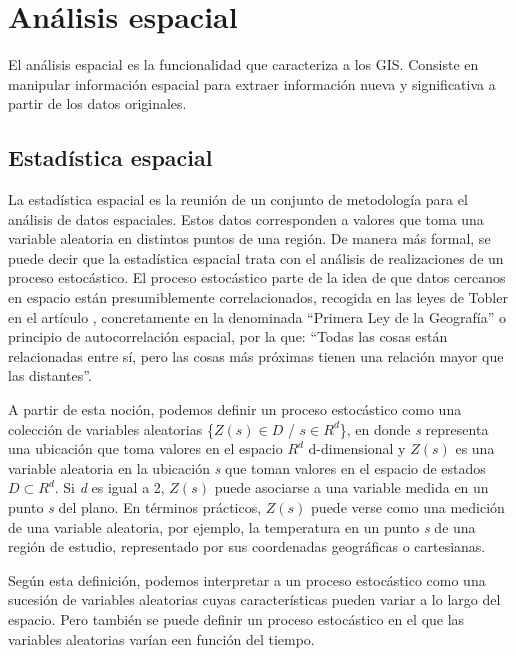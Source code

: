 \chapter*{Análisis espacial} \label{cap:analisis}
\setcounter{chapter}{4} 
\setcounter{section}{0}
El análisis espacial es la funcionalidad que caracteriza a los GIS. Consiste en manipular información espacial para extraer información nueva y significativa a partir de los datos originales. 

\section{Estadística espacial}
La estadística espacial es la reunión de un conjunto de metodología para el análisis de datos espaciales.
Estos datos corresponden a valores que toma una variable aleatoria en distintos puntos de una región. 
De manera más formal, se puede decir que la estadística espacial trata con el análisis de realizaciones de un proceso estocástico.
El proceso estocástico parte de la idea de que datos cercanos en espacio están presumiblemente correlacionados, 
recogida en las leyes de Tobler en el artículo \cite{Tobler1970}, concretamente en la denominada “Primera Ley de la Geografía” o principio de autocorrelación espacial, por la que:
“Todas las cosas están relacionadas entre sí, pero las cosas más próximas tienen una relación mayor que las distantes”.

A partir de esta noción, podemos definir un proceso estocástico como una colección de variables aleatorias \{{$Z(s) \in D$} / {$s \in R^d$}\},
en donde \textit{s} representa una ubicación que toma valores en el espacio $R^d$ d-dimensional 
y {$Z(s)$} es una variable aleatoria en la ubicación \textit{s} que toman valores en el espacio de estados $D \subset R^d$.
Si \textit{d} es igual a 2, $Z(s)$ puede asociarse a una variable medida en un punto \textit{s} del plano.
En términos prácticos, $Z(s)$ puede verse como una medición de una variable aleatoria, por ejemplo, la temperatura
en un punto \textit{s} de una región de estudio, representado por sus coordenadas geográficas o cartesianas.

Según esta definición, podemos interpretar a un proceso estocástico como una sucesión de variables aleatorias cuyas características pueden variar a lo largo del espacio. 
Pero también se puede definir un proceso estocástico en el que las variables aleatorias varían een función del tiempo.

